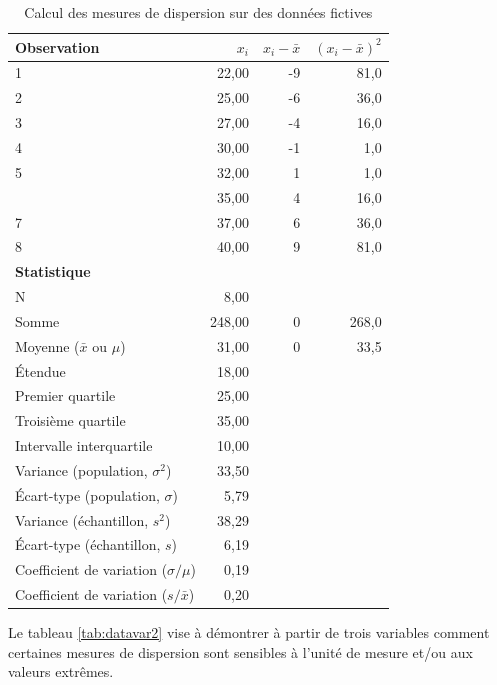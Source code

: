 \documentclass[
  11pt,
  french,
]{book}
\begin{document}
\begin{table}

\caption{\label{tab:datavar}Calcul des mesures de dispersion sur des données fictives}
\centering
\fontsize{8}{10}\selectfont
\begin{tabular}[t]{lrrr}
\toprule
Observation & $x_i$ & $x_i-\bar{x}$ & $(x_i-\bar{x})^2$\\
\midrule
1 & 22,00 & -9 & 81,0\\
2 & 25,00 & -6 & 36,0\\
3 & 27,00 & -4 & 16,0\\
4 & 30,00 & -1 & 1,0\\
5 & 32,00 & 1 & 1,0\\
\addlinespace
6 & 35,00 & 4 & 16,0\\
7 & 37,00 & 6 & 36,0\\
8 & 40,00 & 9 & 81,0\\
\textbf{Statistique} &  &  & \\
N & 8,00 &  & \\
\addlinespace
Somme & 248,00 & 0 & 268,0\\
Moyenne ($\bar{x}$ ou $\mu$) & 31,00 & 0 & 33,5\\
Étendue & 18,00 &  & \\
Premier quartile & 25,00 &  & \\
Troisième quartile & 35,00 &  & \\
\addlinespace
Intervalle interquartile & 10,00 &  & \\
Variance (population, $\sigma^2$) & 33,50 &  & \\
Écart-type (population, $\sigma$) & 5,79 &  & \\
Variance (échantillon, $s^2$) & 38,29 &  & \\
Écart-type (échantillon, $s$) & 6,19 &  & \\
\addlinespace
Coefficient de variation ($\sigma / \mu$) & 0,19 &  & \\
Coefficient de variation ($s / \bar{x}$) & 0,20 &  & \\
\bottomrule
\end{tabular}
\end{table}

Le tableau \ref{tab:datavar2} vise à démontrer à partir de trois variables comment certaines mesures de dispersion sont sensibles à l'unité de mesure et/ou aux valeurs extrêmes.
\end{document}
